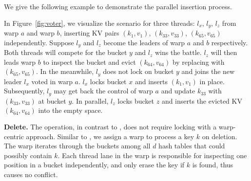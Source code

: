 We give the following example to demonstrate the parallel insertion process.
\begin{example}
	In Figure~\ref{fig:voter}, we visualize the scenario for three threads: $l_x$, $l_y$, $l_z$ from warp $a$ and warp $b$, inserting KV pairs $(k_1,v_1)$, $(k_{33},v_{33})$, $(k_{65},v_{65})$ independently. 
	Suppose $l_y$ and $l_z$ become the leaders of warp $a$ and $b$ respectively. Both threads will compete for the bucket $y$ and $l_z$ wins the battle. 
	$l_z$ will then leads warp $b$ to inspect the bucket and evict $(k_{64},v_{64})$ by replacing with $(k_{65},v_{65})$. 
	In the meanwhile, $l_y$ does not lock on bucket $y$ and joins the new leader $l_x$ voted in warp $a$. 
	$l_x$ locks bucket $x$ and inserts $(k_1,v_1)$ in place. Subsequently, $l_y$ may get back the control of warp $a$ and update $k_{33}$ with $(k_{33},v_{33})$ at bucket $y$. In parallel, $l_z$ locks bucket $z$ and inserts the evicted KV $(k_{64},v_{64})$ into the empty space. 
\end{example}

\vspace{1mm}\noindent\textbf{Delete.} The  operation, in contrast to , does not require locking with a warp-centric approach. 
Similar to , we assign a warp to process a key $k$ on deletion. The warp iterates through the buckets among all $d$ hash tables that could possibly contain $k$. Each thread lane in the warp is responsible for inspecting one position in a bucket independently, and only erase the key if $k$ is found, thus causes no conflict.



